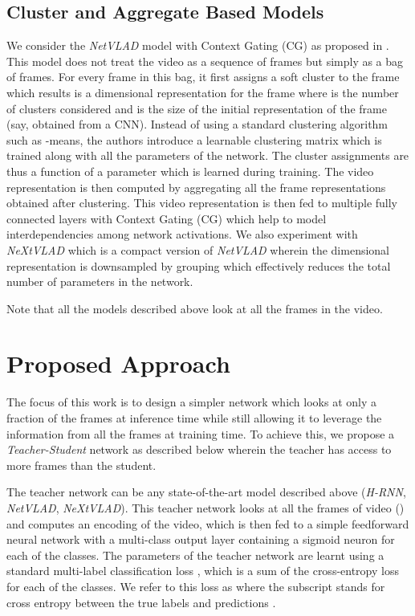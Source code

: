 \documentclass[10pt,twocolumn,letterpaper]{article}
\begin{document}
\subsection{Cluster and Aggregate Based Models}
We consider the \textit{NetVLAD} model with Context Gating (CG) as proposed in \cite{willow}. This model does not treat the video as a sequence of frames but simply as a bag of frames. For every frame in this bag, it first assigns a soft cluster to the frame which results is a  dimensional representation for the frame where  is the number of clusters considered and  is the size of the initial representation of the frame (say, obtained from a CNN). Instead of using a standard clustering algorithm such as -means, the authors introduce a learnable clustering matrix which is trained along with all the parameters of the network. The cluster assignments are thus a function of a parameter which is learned during training. The video representation is then computed by aggregating all the frame representations obtained after clustering. This video representation is then fed to multiple fully connected layers with Context Gating (CG) which help to model interdependencies among network activations. We also experiment with \textit{NeXtVLAD} \cite{paper3} which is a compact version of \textit{NetVLAD} wherein the  dimensional representation is downsampled by grouping which effectively reduces the total number of parameters in the network.

Note that all the models described above look at all the frames in the video.

\section{Proposed Approach}\label{sec-approach}
The focus of this work is to design a simpler network  which looks at only a fraction of the  frames at inference time while still allowing it to leverage the information from all the  frames at training time. To achieve this, we propose a \textit{Teacher-Student} network as described below wherein the teacher has access to more frames than the student.

 The teacher network can be any state-of-the-art model described above (\textit{H-RNN}, \textit{NetVLAD}, \textit{NeXtVLAD}). This teacher network looks at all the  frames of video () and computes an encoding  of the video, which is then fed to a simple feedforward neural network with a multi-class output layer containing a sigmoid neuron for each of the  classes.
The parameters of the teacher network are learnt using  a standard multi-label classification loss , which is a sum of the cross-entropy loss for each of the  classes. We refer to this loss as  where the subscript  stands for cross entropy between the true labels  and predictions .
\end{document}
